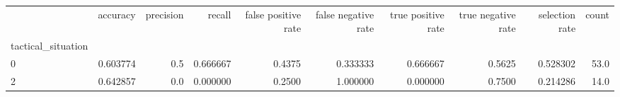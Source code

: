 \begin{tabular}{lrrrrrrrrr}
\toprule
{} &  accuracy &  precision &    recall &  false positive rate &  false negative rate &  true positive rate &  true negative rate &  selection rate &  count \\
tactical\_situation &           &            &           &                      &                      &                     &                     &                 &        \\
\midrule
0                  &  0.603774 &        0.5 &  0.666667 &               0.4375 &             0.333333 &            0.666667 &              0.5625 &        0.528302 &   53.0 \\
2                  &  0.642857 &        0.0 &  0.000000 &               0.2500 &             1.000000 &            0.000000 &              0.7500 &        0.214286 &   14.0 \\
\bottomrule
\end{tabular}
